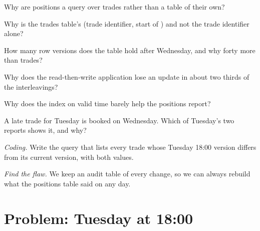 \begin{exercise}[$\star$]\label{exo:pl:databases-and-sql:1}
Why are positions a query over trades rather than a table of their own?
\end{exercise}

\begin{exercise}[$\star$]\label{exo:pl:databases-and-sql:2}
Why is the trades table's  (trade identifier, start of ) and not the trade identifier alone?
\end{exercise}

\begin{exercise}[$\star$]\label{exo:pl:databases-and-sql:3}
How many row versions does the table hold after Wednesday, and why forty more than trades?
\end{exercise}

\begin{exercise}[$\star\star$]\label{exo:pl:databases-and-sql:4}
Why does the read-then-write application lose an update in about two thirds of the interleavings?
\end{exercise}

\begin{exercise}[$\star\star$]\label{exo:pl:databases-and-sql:5}
Why does the index on valid time barely help the positions report?
\end{exercise}

\begin{exercise}[$\star\star$]\label{exo:pl:databases-and-sql:6}
A late trade for Tuesday is booked on Wednesday. Which of Tuesday's two reports shows it, and why?
\end{exercise}

\begin{exercise}[$\star\star\star$]\label{exo:pl:databases-and-sql:7}
\emph{Coding.} Write the query that lists every trade whose Tuesday 18:00 version differs from its current version, with both values.
\end{exercise}

\begin{exercise}[$\star\star\star$]\label{exo:pl:databases-and-sql:8}
\emph{Find the flaw.} \textquotedbl{}We keep an audit table of every change, so we can always rebuild what the positions table said on any
day.\textquotedbl{}
\end{exercise}

\section{Problem: Tuesday at 18:00}

